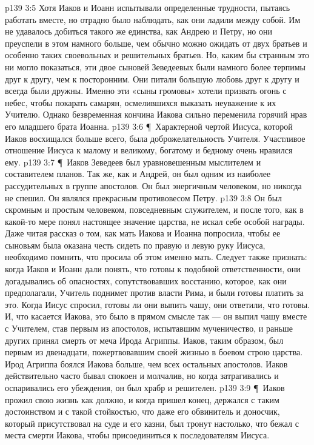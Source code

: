 \vs p139 3:5 Хотя Иаков и Иоанн испытывали определенные трудности, пытаясь работать вместе, но отрадно было наблюдать, как они ладили между собой. Им не удавалось добиться такого же единства, как Андрею и Петру, но они преуспели в этом намного больше, чем обычно можно ожидать от двух братьев и особенно таких своевольных и решительных братьев. Но, каким бы странным это ни могло показаться, эти двое сыновей Зеведеевых были намного более терпимы друг к другу, чем к посторонним. Они питали большую любовь друг к другу и всегда были дружны. Именно эти «сыны громовы» хотели призвать огонь с небес, чтобы покарать самарян, осмелившихся выказать неуважение к их Учителю. Однако безвременная кончина Иакова сильно переменила горячий нрав его младшего брата Иоанна.
\vs p139 3:6 \P\ Характерной чертой Иисуса, которой Иаков восхищался больше всего, была доброжелательность Учителя. Участливое отношение Иисуса к малому и великому, богатому и бедному очень нравился ему.
\vs p139 3:7 \P\ Иаков Зеведеев был уравновешенным мыслителем и составителем планов. Так же, как и Андрей, он был одним из наиболее рассудительных в группе апостолов. Он был энергичным человеком, но никогда не спешил. Он являлся прекрасным противовесом Петру.
\vs p139 3:8 Он был скромным и простым человеком, повседневным служителем, и после того, как в какой\hyp{}то мере понял настоящее значение царства, не искал себе особой награды. Даже читая рассказ о том, как мать Иакова и Иоанна попросила, чтобы ее сыновьям была оказана честь сидеть по правую и левую руку Иисуса, необходимо помнить, что просила об этом именно мать. Следует также признать: когда Иаков и Иоанн дали понять, что готовы к подобной ответственности, они догадывались об опасностях, сопутствовавших восстанию, которое, как они предполагали, Учитель поднимет против власти Рима, и были готовы платить за это. Когда Иисус спросил, готовы ли они выпить чашу, они ответили, что готовы. И, что касается Иакова, это было в прямом смысле так --- он выпил чашу вместе с Учителем, став первым из апостолов, испытавшим мученичество, и раньше других принял смерть от меча Ирода Агриппы. Иаков, таким образом, был первым из двенадцати, пожертвовавшим своей жизнью в боевом строю царства. Ирод Агриппа боялся Иакова больше, чем всех остальных апостолов. Иаков действительно часто бывал спокоен и молчалив, но когда затрагивались и оспаривались его убеждения, он был храбр и решителен.
\vs p139 3:9 \P\ Иаков прожил свою жизнь как должно, и когда пришел конец, держался с таким достоинством и с такой стойкостью, что даже его обвинитель и доносчик, который присутствовал на суде и его казни, был тронут настолько, что бежал с места смерти Иакова, чтобы присоединиться к последователям Иисуса.
